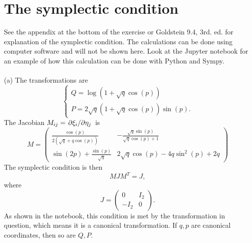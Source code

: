 \documentclass{article}
\begin{document}
    \section{The symplectic condition}
        See the appendix at the bottom of the exercise or Goldstein 9.4, 3rd. ed. for explanation of the symplectic condition. The calculations can be done using computer software and will not be shown here. Look at the Jupyter notebook for an example of how this calculation can be done with Python and Sympy. \\ \\
        (a) The transformations are
        \begin{equation*}
            \begin{cases}
                Q = \log(1 + \sqrt q \cos(p)) \\
                P = 2\sqrt q (1 + \sqrt q \cos(p)) \sin(p).
            \end{cases}    
        \end{equation*}
        The Jacobian $M_{ij} = \pdv*{\xi_i}{\eta_j}$ is
        \begin{equation*}
            M =  \left(
                \begin{matrix}
                    \frac{\cos{\left(p \right)}}{2 \left(\sqrt{q} + q \cos{\left(p \right)}\right)} 
                    & - \frac{\sqrt{q} \sin{\left(p \right)}}{\sqrt{q} \cos{\left(p \right)} + 1}\\
                    \sin{\left(2 p \right)} + \frac{\sin{\left(p \right)}}{\sqrt{q}} 
                    & 2 \sqrt{q} \cos{\left(p \right)} - 4 q \sin^{2}{\left(p \right)} + 2 q
                \end{matrix}\right)
        \end{equation*}
        The symplectic condition is then 
        \begin{equation*}
            M J M^T = J,
        \end{equation*}
        where 
        \begin{equation*}
            J = 
            \begin{pmatrix*}
                0 & I_2 \\
                -I_2 & 0
            \end{pmatrix*}.
        \end{equation*}
        As shown in the notebook, this condition is met by the transformation in question, which means it is a canonical transformation. If $q, p$ are canonical coordinates, then so are $Q, P$. \\ \\
\end{document}
